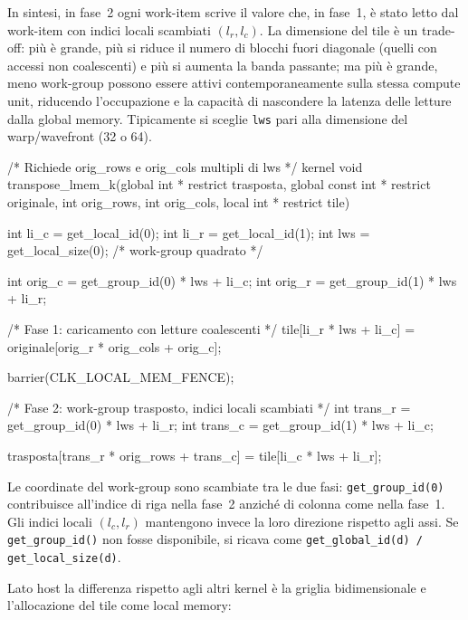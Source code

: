 In sintesi, in fase~2 ogni work-item scrive il valore che, in fase~1, è stato letto dal work-item con indici locali scambiati $(l_r, l_c)$. La dimensione del tile è un trade-off: più è grande, più si riduce il numero di blocchi fuori diagonale (quelli con accessi non coalescenti) e più si aumenta la banda passante; ma più è grande, meno work-group possono essere attivi contemporaneamente sulla stessa compute unit, riducendo l'occupazione e la capacità di nascondere la latenza delle letture dalla global memory. Tipicamente si sceglie \texttt{lws} pari alla dimensione del warp/wavefront (32 o 64).

\begin{code}[caption={Kernel di trasposizione con tile in local memory}, label={code:transpose_lmem}]

/* Richiede orig_rows e orig_cols multipli di lws */
kernel void transpose_lmem_k(global int * restrict trasposta,
                              global const int * restrict originale,
                              int orig_rows, int orig_cols,
                              local int * restrict tile)
{
    int li_c = get_local_id(0);
    int li_r = get_local_id(1);
    int lws  = get_local_size(0); /* work-group quadrato */

    int orig_c = get_group_id(0) * lws + li_c;
    int orig_r = get_group_id(1) * lws + li_r;

    /* Fase 1: caricamento con letture coalescenti */
    tile[li_r * lws + li_c] = originale[orig_r * orig_cols + orig_c];

    barrier(CLK_LOCAL_MEM_FENCE);

    /* Fase 2: work-group trasposto, indici locali scambiati */
    int trans_r = get_group_id(0) * lws + li_r;
    int trans_c = get_group_id(1) * lws + li_c;

    trasposta[trans_r * orig_rows + trans_c] = tile[li_c * lws + li_r];
}
\end{code}

Le coordinate del work-group sono scambiate tra le due fasi: \texttt{get\_group\_id(0)} contribuisce all'indice di riga nella fase~2 anziché di colonna come nella fase~1. Gli indici locali $(l_c, l_r)$ mantengono invece la loro direzione rispetto agli assi. Se \texttt{get\_group\_id()} non fosse disponibile, si ricava come \texttt{get\_global\_id(d)\,/\,get\_local\_size(d)}.

Lato host la differenza rispetto agli altri kernel è la griglia bidimensionale e l'allocazione del tile come local memory:

